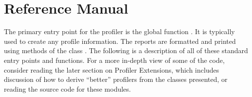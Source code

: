 \section{Reference Manual}




The primary entry point for the profiler is the global function
.  It is typically used to create any profile
information.  The reports are formatted and printed using methods of
the class .  The following is a description of all
of these standard entry points and functions.  For a more in-depth
view of some of the code, consider reading the later section on
Profiler Extensions, which includes discussion of how to derive
``better'' profilers from the classes presented, or reading the source
code for these modules.

